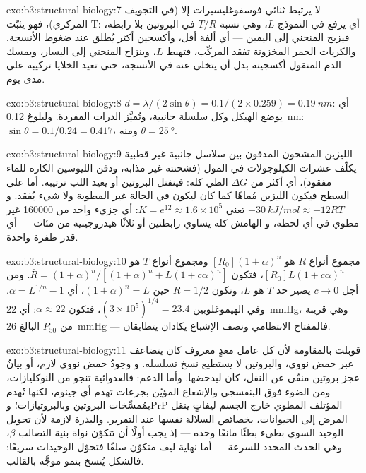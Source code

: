 \begin{solution}{exo:b3:structural-biology:7}
لا يرتبط ثنائي فوسفوغليسيرات إلا  (في التجويف المركزي)، فهو
يثبّت T: أي يرفع في النموذج $L$، وهي نسبة $T/R$ في
البروتين بلا رابطة، فيزيح المنحني إلى اليمين --- أي ألفة
أقل، وأكسجين أكثر يُطلق عند ضغوط الأنسجة. والكريات الحمر المخزونة
تفقد المركّب، فتهبط $L$، وينزاح المنحني إلى اليسار، ويمسك الدم
المنقول أكسجينه بدل أن يتخلى عنه في الأنسجة، حتى
تعيد الخلايا تركيبه على مدى يوم.
\end{solution}

\begin{solution}{exo:b3:structural-biology:8}
$d = \lambda/(2\sin\theta) = 0.1/(2\times 0.259) = \qty{0.19}{nm}$: أي
يوضع الهيكل وكل سلسلة جانبية، وتُميَّز الذرات المفردة.
ولبلوغ \qty{0.12}{nm}: $\sin\theta = 0.1/0.24 = 0.417$، ومنه $\theta =
\qty{25}{\degree}$.
\end{solution}

\begin{solution}{exo:b3:structural-biology:9}
الليزين المشحون المدفون بين سلاسل جانبية غير قطبية يكلّف عشرات
الكيلوجولات في المول (فشحنته غير مذابة، ودفن الليوسين الكاره للماء
مفقود)، أي أكثر من $\Delta G$ الطي كله: فينفتل البروتين
أو يعيد اللب ترتيبه. أما على السطح فيكون الليزين
مُماهًا كما كان ليكون في الحالة غير المطوية ولا شيء يُفقد.
و$\qty{-30}{kJ/mol} \approx -12RT$ تعني $K = e^{12} \approx 1.6\times
10^{5}$: أي جزيء واحد من \num{160000} غير مطوي في أي لحظة، و
الهامش كله يساوي رابطتين أو ثلاثًا هيدروجينية من مئات
--- أي قدر طفرة واحدة.
\end{solution}

\begin{solution}{exo:b3:structural-biology:10}
مجموع أنواع $R$ هو $[R_{0}](1+\alpha)^{n}$ ومجموع أنواع $T$ هو
$[R_{0}]L(1+c\alpha)^{n}$، فتكون $\bar R = (1+\alpha)^{n}/[(1+\alpha)^{n}
+ L(1+c\alpha)^{n}]$. ومن أجل $c \to 0$ يصير حد $T$ هو $L$، وتكون $\bar R =
1/2$ حين $(1+\alpha)^{n} = L$، أي $\alpha = L^{1/n} - 1$. وفي
الهيموغلوبين $(3\times 10^{5})^{1/4} = 23.4$، فتكون $\alpha \approx 22$:
أي \qty{22}{mmHg}، وهي قريبة من $P_{50}$ البالغ \qty{26}{mmHg} ---
فالمفتاح الانتظامي ونصف الإشباع يكادان يتطابقان.
\end{solution}

\begin{solution}{exo:b3:structural-biology:11}
قوبلت بالمقاومة لأن كل عامل معدٍ معروف كان يتضاعف
عبر حمض نووي، والبروتين لا يستطيع نسخ تسلسله. و
وجودُ حمض نووي لازم، أو بيانُ عجز بروتين منقّى عن
النقل، كان ليدحضها. وأما الدعم: فالعدوائية تنجو من النوكليازات،
ومن الضوء فوق البنفسجي والإشعاع المؤيّن بجرعات تهدم أي جينوم،
لكنها تُهدم بمُمسِّخات البروتين وبالبروتيازات؛ وPrP
المؤتلف المطوي خارج الجسم ليفاتٍ ينقل المرض إلى الحيوانات، بخصائص
السلالة نفسها عند التمرير. والبذرة لازمة لأن
تحويل الوحيد السوي بطيء بطئًا مانعًا وحده --- إذ يجب أولًا أن
تتكوّن نواة بنية التصالب $\beta$، وهي الحدث المحدد
للسرعة --- أما نهاية ليف متكوّن سلفًا فتحوّل
الوحيدات سريعًا: فالشكل يُنسخ بنمو موجَّه بالقالب.
\end{solution}

